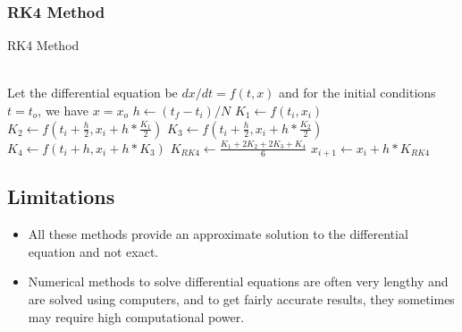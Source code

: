 \documentclass[12pt]{article}
\begin{document}
    \subsubsection{RK4 Method}
    \begin{algorithm}[H]
  \caption{RK4 Method}
  \begin{algorithmic}
    \\
    \Comment Let the differential equation be $dx/dt = f(t,x)$ and for the initial conditions $t=t_o$, we have $x=x_o$
    \State $h \gets (t_f - t_i)/N$
     \State $K_1 \gets f(t_i, x_i)$
     \State $K_2 \gets f(t_i + \frac{h}{2}, x_i + h*\frac{K_1}{2})$
     \State $K_3 \gets f(t_i + \frac{h}{2}, x_i + h*\frac{K_2}{2})$
     \State $K_4 \gets f(t_i + h, x_i + h*K_3)$
     \State $K_{RK4} \gets \frac{K_1 + 2K_2 + 2K_3 + K_4}{6}$
        \State \texttt{$x_{i+1} \gets x_i + h*K_{RK4}$}
      \EndFor
    \EndProcedure
  \end{algorithmic}
\end{algorithm}
\newpage
\subsection{Limitations}
\begin{itemize}
    \item All these methods provide an approximate solution to the differential equation and not exact.
    \item Numerical methods to solve differential equations are often very lengthy and are solved using computers, and to get fairly accurate results, they sometimes may require high computational power.

\end{itemize}
\newpage
\end{document}
